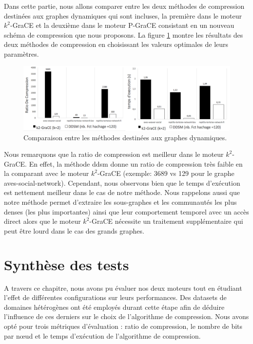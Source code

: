 	Dans cette partie, nous allons comparer entre les deux méthodes de compression destinées aux graphes dynamiques qui sont incluses, la première dans le moteur $k^2$-GraCE et la deuxième dans le moteur P-GraCE consistant en un nouveau schéma de compression que nous proposons. La figure \ref{fig:comp-dyn} montre les résultats des deux méthodes de compression en choisissant les valeurs optimales de leurs paramètres.
	
	\begin{figure}[H]
		\begin{center}
		 \includegraphics[scale=0.4]{ressources/image/dynComp.png}
			
			
			\caption{Comparaison entre les méthodes destinées aux graphes dynamiques.}
			\label{fig:comp-dyn}
		\end{center}
	\end{figure}
	
	
	Nous remarquons que la ratio de compression est meilleur dans le moteur $k^2$-GraCE. En effet, la méthode \gls{ddsm} donne un ratio de compression très faible en la comparant avec le moteur $k^2$-GraCE (exemple: 3689 vs 129 pour le graphe aves-social-network). Cependant, nous observons bien que le temps d'exécution est nettement meilleur dans le cas de notre méthode. Nous rappelons aussi que notre méthode permet d'extraire les sous-graphes et les communautés les plus denses (les plus importantes) ainsi que leur comportement temporel avec un accès direct alors que le moteur $k^2$-GraCE nécessite un traitement supplémentaire qui peut être lourd dans le cas des grands graphes. 
	
	 
	
	\section{Synthèse des tests}
	
	A travers ce chapitre,  nous avons pu évaluer nos deux moteurs tout en étudiant l'effet de différentes configurations sur leurs performances. Des datasets de domaines hétérogènes ont été employés durant cette étape afin de déduire l'influence de ces derniers sur le choix de l'algorithme de compression. Nous avons opté pour trois métriques d'évaluation : ratio de compression, le nombre de bits par nœud et le temps d'exécution de l'algorithme de compression.
	
